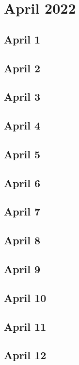 \chapter{April 2022}

\section{April 1}

\section{April 2}

\section{April 3}

\section{April 4}

\section{April 5}

\section{April 6}

\section{April 7}

\section{April 8}

\section{April 9}

\section{April 10}

\section{April 11}

\section{April 12}

